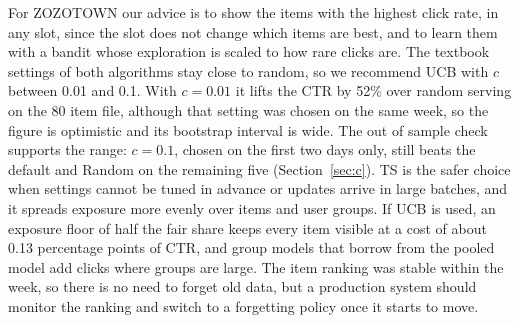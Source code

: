 \documentclass[11pt]{article}
\begin{document}
For ZOZOTOWN our advice is to show the items with the highest click rate, in
any slot, since the slot does not change which items are best, and to learn
them with a bandit whose exploration is scaled to how rare clicks are. The
textbook settings of both algorithms stay close to random, so we recommend
UCB with $c$ between 0.01 and 0.1. With $c=0.01$ it lifts the CTR by 52\%
over random serving on the 80 item file, although that setting was chosen
on the same week, so the figure is optimistic and its bootstrap interval is
wide. The out of sample check supports the range: $c=0.1$, chosen on the
first two days only, still beats the default and Random on the remaining
five (Section~\ref{sec:c}). TS is the safer choice when settings cannot be
tuned in advance or updates arrive in large batches, and it spreads exposure
more evenly over items and user groups. If UCB is used, an exposure floor of
half the fair share keeps every item visible at a cost of about 0.13
percentage points of CTR, and group models that borrow from the pooled model
add clicks where groups are large. The item ranking was stable within the
week, so there is no need to forget old data, but a production system should
monitor the ranking and switch to a forgetting policy once it starts to
move.
\end{document}
